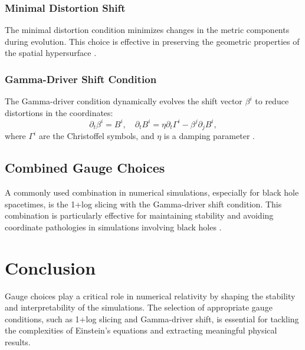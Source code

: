 \documentclass[11pt,a4paper]{article}
\begin{document}
\subsubsection{Minimal Distortion Shift}
The minimal distortion condition minimizes changes in the metric components during evolution. This choice is effective in preserving the geometric properties of the spatial hypersurface \cite{smarr1979structure}.

\subsubsection{Gamma-Driver Shift Condition}
The Gamma-driver condition dynamically evolves the shift vector $\beta^i$ to reduce distortions in the coordinates:
\[
\partial_t \beta^i = B^i, \quad \partial_t B^i = \eta \partial_t \Gamma^i - \beta^j \partial_j B^i,
\]
where $\Gamma^i$ are the Christoffel symbols, and $\eta$ is a damping parameter \cite{alcubierre2003gauge}.

\subsection{Combined Gauge Choices}
A commonly used combination in numerical simulations, especially for black hole spacetimes, is the 1+log slicing with the Gamma-driver shift condition. This combination is particularly effective for maintaining stability and avoiding coordinate pathologies in simulations involving black holes \cite{campanelli2006accurate,baker2006gravitational}.

\section{Conclusion}
Gauge choices play a critical role in numerical relativity by shaping the stability and interpretability of the simulations. The selection of appropriate gauge conditions, such as 1+log slicing and Gamma-driver shift, is essential for tackling the complexities of Einstein's equations and extracting meaningful physical results.



\end{document}
